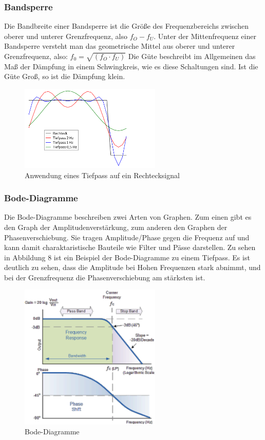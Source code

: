 \subsubsection{Bandsperre}
Die Bandbreite einer Bandsperre ist die Größe des Frequenzbereichs zwischen oberer und unterer Grenzfrequenz, also $f_O -f_U$.
Unter der Mittenfrequenz einer Bandsperre versteht man das geometrische Mittel aus oberer und unterer Grenzfrequenz, also: $f_0=\sqrt{(f_O·f_U)}$
Die Güte beschreibt im Allgemeinen das Maß der Dämpfung in einem Schwingkreis, wie es diese Schaltungen sind.
Ist die Güte Groß, so ist die Dämpfung klein.
\begin{figure}[H]
    \centering
    \includegraphics[width=0.6\textwidth]{Abb/rechtecktief.pdf} 
    \caption{Anwendung eines Tiefpass auf ein Rechtecksignal}
\end{figure}

\subsubsection{Bode-Diagramme}
Die Bode-Diagramme beschreiben zwei Arten von Graphen. Zum einen gibt es den Graph der Amplitudenverstärkung, zum anderen den Graphen der Phasenverschiebung. Sie tragen Amplitude/Phase gegen die Frequenz auf und kann damit charaktaristische Bauteile wie Filter und Pässe darstellen. Zu sehen in Abbildung 8 ist ein Beispiel der Bode-Diagramme zu einem Tiefpass. Es ist deutlich zu sehen, dass die Amplitude bei Hohen Frequenzen stark abnimmt, und bei der Grenzfrequenz die Phasenverschiebung am stärksten ist.
\begin{figure}[H]
    \centering
    \includegraphics[width=0.6\textwidth]{Abb/bode.pdf}
    \caption{Bode-Diagramme} 
\end{figure}

